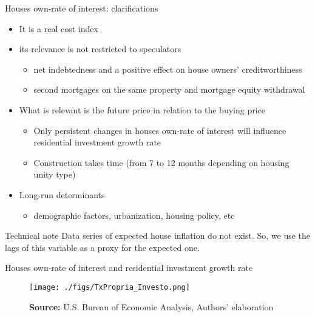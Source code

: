 \documentclass[10pt]{beamer}
\begin{document}
\begin{frame}[label={sec:org52661d3}]{Houses own-rate of interest: clarifications}
\label{OwnClarification}

\begin{itemize}
\item It is a \alert{real cost} index
\item its relevance is \alert{not} restricted to speculators
\begin{itemize}
\item net indebtedness and a positive effect on house owners’ creditworthiness
\item second mortgages on the same property and mortgage equity withdrawal
\end{itemize}
\item What is relevant is the \alert{future} price in relation to the buying price
\begin{itemize}
\item Only persistent changes in houses own-rate of interest will influence residential investment growth rate
\item Construction takes time (from 7 to 12 months depending on housing unity type) \hyperlink{constructionPlot}{}
\end{itemize}
\item Long-run determinants
\begin{itemize}
\item demographic factors, urbanization, housing policy, etc
\end{itemize}
\end{itemize}

\begin{block}{Technical note}
Data series of expected house inflation do not exist.
So, we use the lags of this variable as a proxy for the expected one.
\end{block}
\end{frame}

\begin{frame}[label={sec:org3b9a562}]{Houses own-rate of interest and residential investment growth rate}
\begin{figure}[htb]
	\centering
	\texttt{[image: ./figs/TxPropria\_Investo.png]}
	\caption*{\textbf{Source:} U.S. Bureau of Economic Analysis, Authors' elaboration}
\end{figure}
\end{frame}
\end{document}
